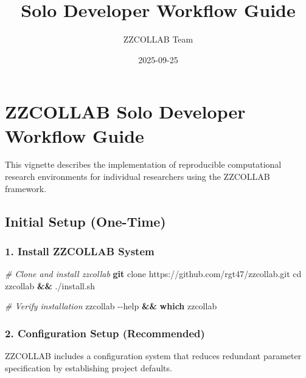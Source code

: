 \documentclass[
]{article}
\title{Solo Developer Workflow Guide}
\author{ZZCOLLAB Team}
\date{2025-09-25}
\newenvironment{Shaded}{\begin{snugshade}}{\end{snugshade}}
\newcommand{\AttributeTok}[1]{\textcolor[rgb]{0.13,0.29,0.53}{#1}}
\newcommand{\BuiltInTok}[1]{#1}
\newcommand{\CommentTok}[1]{\textcolor[rgb]{0.56,0.35,0.01}{\textit{#1}}}
\newcommand{\ExtensionTok}[1]{#1}
\newcommand{\FunctionTok}[1]{\textcolor[rgb]{0.13,0.29,0.53}{\textbf{#1}}}
\newcommand{\KeywordTok}[1]{\textcolor[rgb]{0.13,0.29,0.53}{\textbf{#1}}}
\newcommand{\NormalTok}[1]{#1}
\begin{document}
\maketitle

\section{ZZCOLLAB Solo Developer Workflow
Guide}\label{zzcollab-solo-developer-workflow-guide}

This vignette describes the implementation of reproducible computational
research environments for individual researchers using the ZZCOLLAB
framework.

\subsection{Initial Setup (One-Time)}\label{initial-setup-one-time}

\subsubsection{1. Install ZZCOLLAB
System}\label{install-zzcollab-system}

\begin{Shaded}
\begin{Highlighting}[]
\CommentTok{\# Clone and install zzcollab}
\FunctionTok{git}\NormalTok{ clone https://github.com/rgt47/zzcollab.git}
\BuiltInTok{cd}\NormalTok{ zzcollab }\KeywordTok{\&\&} \ExtensionTok{./install.sh}

\CommentTok{\# Verify installation  }
\ExtensionTok{zzcollab} \AttributeTok{{-}{-}help} \KeywordTok{\&\&} \FunctionTok{which}\NormalTok{ zzcollab}
\end{Highlighting}
\end{Shaded}

\subsubsection{2. Configuration Setup
(Recommended)}\label{configuration-setup-recommended}

ZZCOLLAB includes a configuration system that reduces redundant
parameter specification by establishing project defaults.
\end{document}
